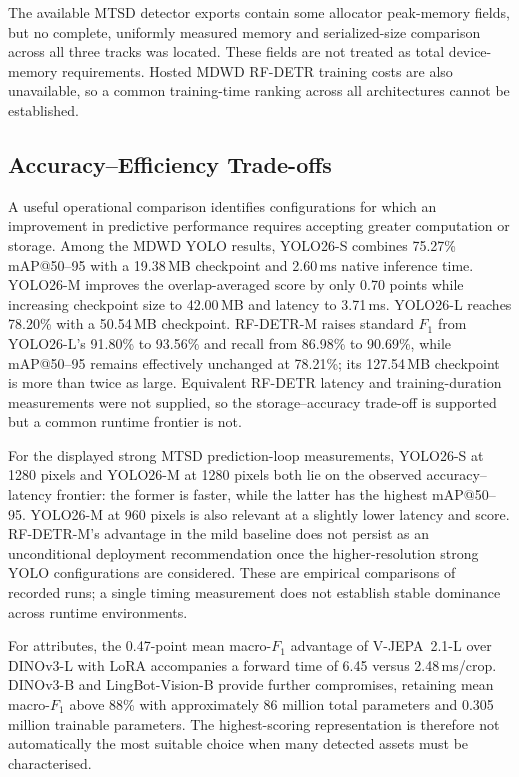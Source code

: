The available MTSD detector exports contain some allocator peak-memory fields, but no complete, uniformly measured memory and serialized-size comparison across all three tracks was located. These fields are not treated as total device-memory requirements. Hosted MDWD RF-DETR training costs are also unavailable, so a common training-time ranking across all architectures cannot be established.

\subsection{Accuracy--Efficiency Trade-offs}
\label{sec:ev-pareto}
A useful operational comparison identifies configurations for which an improvement in predictive performance requires accepting greater computation or storage. Among the MDWD YOLO results, YOLO26-S combines 75.27\% \gls{mAP}@50--95 with a 19.38\,MB checkpoint and 2.60\,ms native inference time. YOLO26-M improves the overlap-averaged score by only 0.70 points while increasing checkpoint size to 42.00\,MB and latency to 3.71\,ms. YOLO26-L reaches 78.20\% with a 50.54\,MB checkpoint. RF-DETR-M raises standard \(F_1\) from YOLO26-L's 91.80\% to 93.56\% and recall from 86.98\% to 90.69\%, while \gls{mAP}@50--95 remains effectively unchanged at 78.21\%; its 127.54\,MB checkpoint is more than twice as large. Equivalent RF-DETR latency and training-duration measurements were not supplied, so the storage--accuracy trade-off is supported but a common runtime frontier is not.

For the displayed strong MTSD prediction-loop measurements, YOLO26-S at 1280 pixels and YOLO26-M at 1280 pixels both lie on the observed accuracy--latency frontier: the former is faster, while the latter has the highest \gls{mAP}@50--95. YOLO26-M at 960 pixels is also relevant at a slightly lower latency and score. RF-DETR-M's advantage in the mild baseline does not persist as an unconditional deployment recommendation once the higher-resolution strong YOLO configurations are considered. These are empirical comparisons of recorded runs; a single timing measurement does not establish stable dominance across runtime environments.

For attributes, the 0.47-point mean macro-\(F_1\) advantage of V-JEPA~2.1-L over DINOv3-L with \gls{LoRA} accompanies a forward time of 6.45 versus 2.48\,ms/crop. DINOv3-B and LingBot-Vision-B provide further compromises, retaining mean macro-\(F_1\) above 88\% with approximately 86 million total parameters and 0.305 million trainable parameters. The highest-scoring representation is therefore not automatically the most suitable choice when many detected assets must be characterised.

